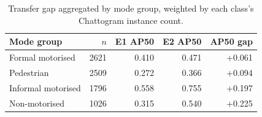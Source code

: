 \begin{table}[t]
\centering
\caption{Transfer gap aggregated by mode group, weighted by each class's Chattogram instance count.}
\label{tab:modegroup}
\begin{tabular}{lrrrr}
\toprule
Mode group & $n$ & E1 AP50 & E2 AP50 & AP50 gap \\
\midrule
Formal motorised & 2621 & 0.410 & 0.471 & +0.061 \\
Pedestrian & 2509 & 0.272 & 0.366 & +0.094 \\
Informal motorised & 1796 & 0.558 & 0.755 & +0.197 \\
Non-motorised & 1026 & 0.315 & 0.540 & +0.225 \\
\bottomrule
\end{tabular}
\end{table}
